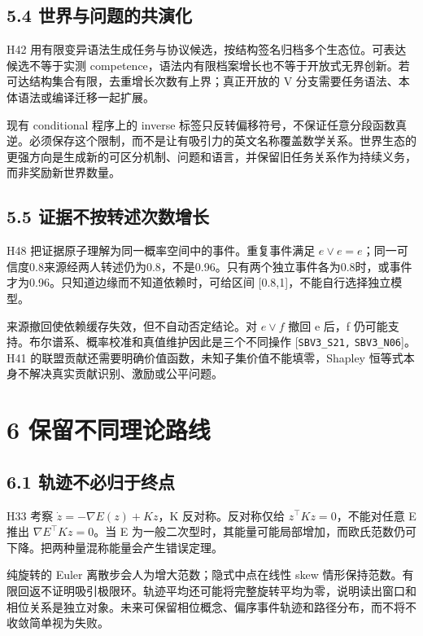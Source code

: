 \documentclass[
  10pt,
]{article}
\begin{document}
\subsection{5.4
世界与问题的共演化}\label{ux4e16ux754cux4e0eux95eeux9898ux7684ux5171ux6f14ux5316}

H42
用有限变异语法生成任务与协议候选，按结构签名归档多个生态位。可表达候选不等于实测
competence，语法内有限档案增长也不等于开放式无界创新。若可达结构集合有限，去重增长次数有上界；真正开放的
V 分支需要任务语法、本体语法或编译迁移一起扩展。

现有 conditional 程序上的 inverse
标签只反转偏移符号，不保证任意分段函数真逆。必须保存这个限制，而不是让有吸引力的英文名称覆盖数学关系。世界生态的更强方向是生成新的可区分机制、问题和语言，并保留旧任务关系作为持续义务，而非奖励新世界数量。

\subsection{5.5
证据不按转述次数增长}\label{ux8bc1ux636eux4e0dux6309ux8f6cux8ff0ux6b21ux6570ux589eux957f}

H48 把证据原子理解为同一概率空间中的事件。重复事件满足
\(e\lor e=e\)；同一可信度0.8来源经两人转述仍为0.8，不是0.96。只有两个独立事件各为0.8时，或事件才为0.96。只知道边缘而不知道依赖时，可给区间
{[}0.8,1{]}，不能自行选择独立模型。

来源撤回使依赖缓存失效，但不自动否定结论。对 \(e\lor f\) 撤回 e 后，f
仍可能支持。布尔谱系、概率校准和真值维护因此是三个不同操作
{[}\nolinkurl{SBV3_S21,} \nolinkurl{SBV3_N06}{]}。H41
的联盟贡献还需要明确价值函数，未知子集价值不能填零，Shapley
恒等式本身不解决真实贡献识别、激励或公平问题。

\section{6
保留不同理论路线}\label{ux4fddux7559ux4e0dux540cux7406ux8bbaux8defux7ebf}

\subsection{6.1
轨迹不必归于终点}\label{ux8f68ux8ff9ux4e0dux5fc5ux5f52ux4e8eux7ec8ux70b9}

H33 考察 \(\dot z=-\nabla E(z)+Kz\)，K 反对称。反对称仅给
\(z^\top Kz=0\)，不能对任意 E 推出 \(\nabla E^\top Kz=0\)。当 E
为一般二次型时，其能量可能局部增加，而欧氏范数仍可下降。把两种量混称能量会产生错误定理。

纯旋转的 Euler 离散步会人为增大范数；隐式中点在线性 skew
情形保持范数。有限回返不证明吸引极限环。轨迹平均还可能将完整旋转平均为零，说明读出窗口和相位关系是独立对象。未来可保留相位概念、偏序事件轨迹和路径分布，而不将不收敛简单视为失败。
\end{document}

